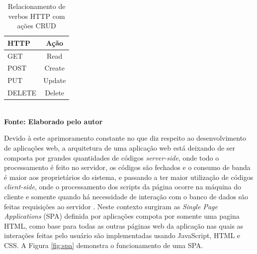 \begin{table}[htb]
	\centering
	\caption{\hspace{0.1cm} Relacionamento de verbos HTTP com ações CRUD}
	\vspace{-0.3cm} %
	\label{tab:tabela1}
	\begin{tabular}{l|c}
  \hline
    \textbf{HTTP} & \textbf{Ação} \\
    \hline
      GET & Read \\
      POST & Create \\
      PUT & Update \\
      DELETE & Delete \\
     \hline
 \end{tabular}
 	\vspace{.1cm}  %
	\small
	{\footnotesize\\ \textbf{Fonte: Elaborado pelo autor}}
\end{table}

Devido à este aprimoramento constante no que diz respeito ao desenvolvimento de aplicações web, a arquitetura de uma aplicação web está deixando 
de ser composta por grandes quantidades de códigos \textit{server-side}, onde todo o processamento é feito no servidor, os códigos são fechados e 
o consumo de banda é maior aos proprietários do sistema, e passando a ter maior utilização de códigos \textit{client-side}, onde o processamento dos 
scripts da página ocorre na máquina do cliente e somente quando há necessidade de interação com o banco de dados são feitas requisições ao servidor 
\cite{spa01}. Neste contexto surgiram as \textit{Single Page Applications} (SPA) definida por \cite{spa02} aplicações compota por somente uma 
pagina HTML, como base para todas as outras páginas web da aplicação nas quais as interações feitas pelo usuário são implementadas usando JavaScript,
HTML e CSS. A Figura \ref{fig:spa} demonstra o funcionamento de uma SPA.

